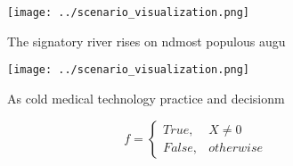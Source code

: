 \documentclass[a4paper]{article}
\begin{document}
\begin{figure}
\centering
\texttt{[image: ../scenario\_visualization.png]}
\caption{The signatory river rises on ndmost populous augu
}
\end{figure}
 
\begin{figure}
\centering
\texttt{[image: ../scenario\_visualization.png]}
\caption{As cold medical technology practice and decisionm
}
\end{figure}
 
\begin{equation}   f =
\begin{cases} True, & X \neq 0\\
False, & otherwise
\end{cases}
\end{equation}
\end{document}
